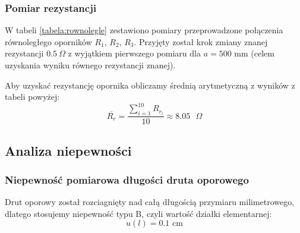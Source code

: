 \documentclass[a4paper,12pts]{article}
\begin{document}
	\subsubsection{Pomiar rezystancji}
	W tabeli \ref{tabela:rownolegle} zestawiono pomiary przeprowadzone połączenia równoległego oporników $R_1$, $R_2$, $R_3$. Przyjęty został krok zmiany znanej rezystancji $0.5 ~\Omega$ z wyjątkiem pierwszego pomiaru dla $a = 500$ mm (celem uzyskania wyniku równego rezystancji znanej).
	
	\begin{table}[!h]
		\centering
		\caption{Wyniki pomiarów dla połączenia równoległego}
		\label{tabela:rownolegle}
	\end{table}
	
	Aby uzyskać rezystancję opornika obliczamy średnią arytmetyczną z wyników z tabeli powyżej:
	\begin{equation}
	\overline{R_{r}} = \frac{\sum_{i = 1}^{10} R_{{r}_i}}{10} \approx 8.05 \textrm{ $\Omega$}
	\end{equation}
	
	
	\subsection{Analiza niepewności}
	
	\subsubsection{Niepewność pomiarowa długości druta oporowego}
	
	Drut oporowy został rozciagnięty nad całą długością przymiaru milimetrowego, dlatego stosujemy niepewność typu B, czyli wartość działki elementarnej:
	\begin{equation}
		u(l) = 0.1 \textrm{ cm}
	\end{equation}
	
\end{document}
